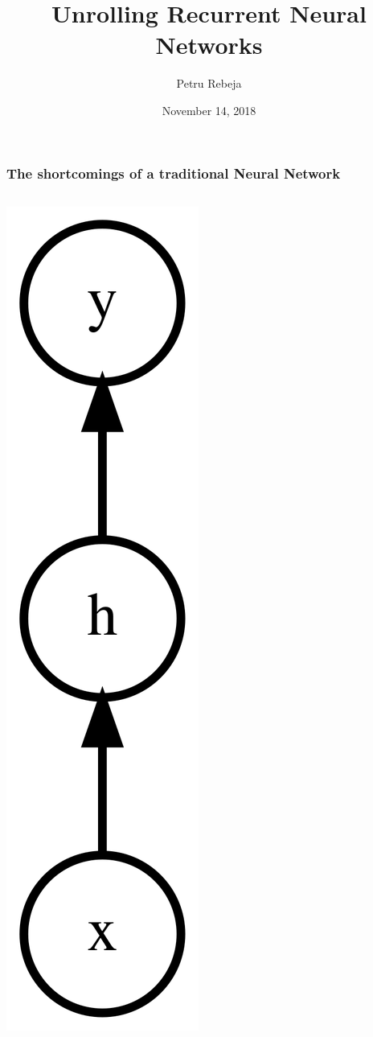 \documentclass{beamer}
\title{Unrolling Recurrent Neural Networks}
\author{Petru Rebeja}
\date{November 14, 2018}
\begin{document}
\maketitle
\begin{frame}
  \frametitle{The shortcomings of a traditional Neural Network \cite{rnn-efectiveness}}
  \begin{columns}
    \begin{column}{0.3\textwidth}
      \begin{center}
        \includegraphics[height=0.6\textheight]{../img/traditional-nn.png}

\end{center}
\end{column}
\end{columns}
\end{frame}
\end{document}
